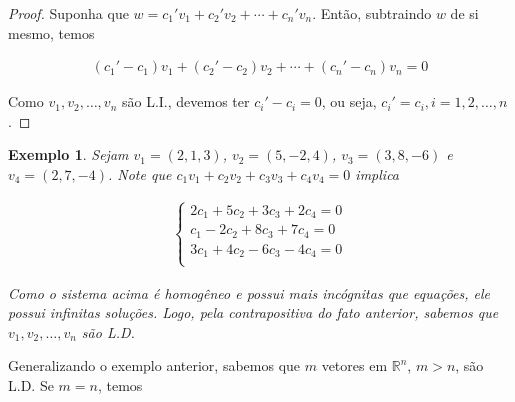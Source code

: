 \documentclass{article}
\newtheorem*{example}{Exemplo}
\begin{document}
\begin{proof}
	Suponha que $w = c_1'v_1 + c_2'v_2 + \cdots + c_n'v_n$. Então, subtraindo $w$ de si mesmo, temos
	
	\begin{align*}
	(c_1' - c_1)v_1 + (c_2' - c_2)v_2 + \cdots + (c_n' - c_n)v_n = 0
	\end{align*}
	
	\par\vspace{0.3cm} Como $v_1, v_2,\dots, v_n$ são L.I., devemos ter $c_i' - c_i = 0$, ou seja, $c_i' = c_i, i = 1, 2, \dots, n$. 
	
\end{proof}

\begin{example}
	Sejam $v_1 = (2, 1, 3)$, $v_2 = (5, -2, 4)$, $v_3 = (3, 8, -6)$ e $v_4 = (2, 7, -4)$. Note que $c_1v_1 + c_2v_2 + c_3v_3 + c_4v_4 = 0$ implica 
	
	\begin{align*}
	\begin{cases}
	2c_1 + 5c_2 + 3c_3 + 2c_4 = 0 \\
	c_1 - 2c_2 + 8c_3 + 7c_4 = 0 \\
	3c_1 + 4c_2 - 6c_3 - 4c_4 = 0 \\
	\end{cases}
	\end{align*}
	
	\par\vspace{0.3cm} Como o sistema acima é homogêneo e possui mais incógnitas que equações, ele possui infinitas soluções. Logo, pela contrapositiva do fato anterior, sabemos que $v_1, v_2, \dots, v_n$ são L.D.
	
\end{example}

\par\vspace{0.3cm} Generalizando o exemplo anterior, sabemos que $m$ vetores em $\mathbb{R}^n$, $m>n$, são L.D. Se $m=n$, temos
\end{document}
